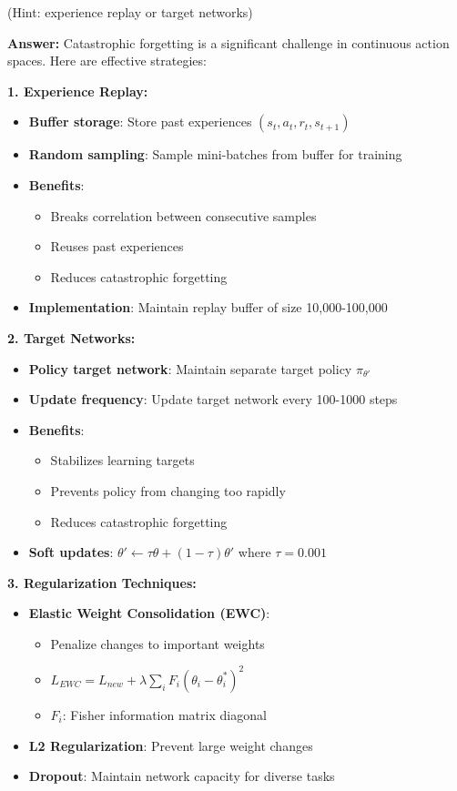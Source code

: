 \documentclass[12pt]{article}
\begin{document}
{{{(Hint: experience replay or target networks)
\vspace*{0.3cm}

\textbf{Answer:} Catastrophic forgetting is a significant challenge in continuous action spaces. Here are effective strategies:

\textbf{1. Experience Replay:}
\begin{itemize}
    \item \textbf{Buffer storage}: Store past experiences $(s_t, a_t, r_t, s_{t+1})$
    \item \textbf{Random sampling}: Sample mini-batches from buffer for training
    \item \textbf{Benefits}: 
    \begin{itemize}
        \item Breaks correlation between consecutive samples
        \item Reuses past experiences
        \item Reduces catastrophic forgetting
    \end{itemize}
    \item \textbf{Implementation}: Maintain replay buffer of size 10,000-100,000
\end{itemize}

\textbf{2. Target Networks:}
\begin{itemize}
    \item \textbf{Policy target network}: Maintain separate target policy $\pi_{\theta'}$
    \item \textbf{Update frequency}: Update target network every 100-1000 steps
    \item \textbf{Benefits}:
    \begin{itemize}
        \item Stabilizes learning targets
        \item Prevents policy from changing too rapidly
        \item Reduces catastrophic forgetting
    \end{itemize}
    \item \textbf{Soft updates}: $\theta' \leftarrow \tau\theta + (1-\tau)\theta'$ where $\tau = 0.001$
\end{itemize}

\textbf{3. Regularization Techniques:}
\begin{itemize}
    \item \textbf{Elastic Weight Consolidation (EWC)}:
    \begin{itemize}
        \item Penalize changes to important weights
        \item $L_{EWC} = L_{new} + \lambda \sum_i F_i (\theta_i - \theta_i^*)^2$
        \item $F_i$: Fisher information matrix diagonal
    \end{itemize}
    \item \textbf{L2 Regularization}: Prevent large weight changes
    \item \textbf{Dropout}: Maintain network capacity for diverse tasks
\end{itemize}

}}}
\end{document}
